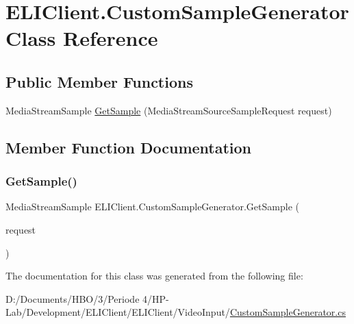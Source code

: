 \hypertarget{class_e_l_i_client_1_1_custom_sample_generator}{}\section{E\+L\+I\+Client.\+Custom\+Sample\+Generator Class Reference}
\label{class_e_l_i_client_1_1_custom_sample_generator}
\subsection*{Public Member Functions}
\begin{DoxyCompactItemize}
\item 
Media\+Stream\+Sample \hyperlink{class_e_l_i_client_1_1_custom_sample_generator_a1500f0ec4775650365d01ea7b130e8da}{Get\+Sample} (Media\+Stream\+Source\+Sample\+Request request)
\end{DoxyCompactItemize}


\subsection{Member Function Documentation}
\mbox{\label{class_e_l_i_client_1_1_custom_sample_generator_a1500f0ec4775650365d01ea7b130e8da}} 
\subsubsection{\texorpdfstring{Get\+Sample()}{GetSample()}}
{\footnotesize\ttfamily Media\+Stream\+Sample E\+L\+I\+Client.\+Custom\+Sample\+Generator.\+Get\+Sample (\begin{DoxyParamCaption}\item[{Media\+Stream\+Source\+Sample\+Request}]{request }\end{DoxyParamCaption})\hspace{0.3cm}{\ttfamily [inline]}}



The documentation for this class was generated from the following file\+:\begin{DoxyCompactItemize}
\item 
D\+:/\+Documents/\+H\+B\+O/3/\+Periode 4/\+H\+P-\/\+Lab/\+Development/\+E\+L\+I\+Client/\+E\+L\+I\+Client/\+Video\+Input/\hyperlink{_custom_sample_generator_8cs}{Custom\+Sample\+Generator.\+cs}\end{DoxyCompactItemize}
